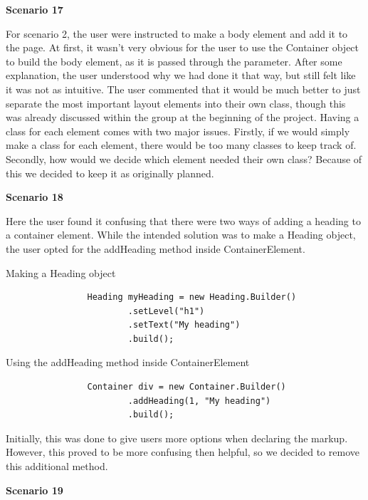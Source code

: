 \documentclass[12pt]{article}
\begin{document}
        \textbf{Scenario 17}

        For scenario 2, the user were instructed to make a body element and add it to the page. At first, it wasn't very obvious for the user to use the Container object to build the body element, as it is passed through the parameter. After some explanation, the user understood why we had done it that way, but still felt like it was not as intuitive. The user commented that it would be much better to just separate the most important layout elements into their own class, though this was already discussed within the group at the beginning of the project. Having a class for each element comes with two major issues. Firstly, if we would simply make a class for each element, there would be too many classes to keep track of. Secondly, how would we decide which element needed their own class? Because of this we decided to keep it as originally planned.

        \textbf{Scenario 18}

        Here the user found it confusing that there were two ways of adding a heading to a container element. While the intended solution was to make a Heading object, the user opted for the addHeading method inside ContainerElement.

        \begin{shaded}
            Making a Heading object

            \begin{lstlisting}
                Heading myHeading = new Heading.Builder()
                        .setLevel("h1")
                        .setText("My heading")
                        .build();
            \end{lstlisting}

            Using the addHeading method inside ContainerElement

            \begin{lstlisting}
                Container div = new Container.Builder()
                        .addHeading(1, "My heading")
                        .build();
            \end{lstlisting}
        \end{shaded}

        Initially, this was done to give users more options when declaring the markup. However, this proved to be more confusing then helpful, so we decided to remove this additional method.

        \textbf{Scenario 19}
\end{document}
